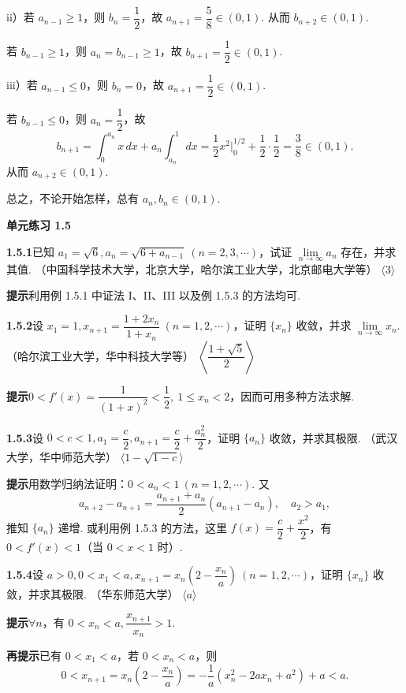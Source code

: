 \documentclass[UTF8, 12pt, fontset=fandol, oneside]{ctexart}
\begin{document}
ii）若 $a_{n-1}\ge 1$，则 $b_n=\dfrac12$，故 $a_{n+1}=\dfrac58\in (0,1)$. 从而 $b_{n+2}\in (0,1)$.

若 $b_{n-1}\ge 1$，则 $a_n=b_{n-1}\ge 1$，故 $b_{n+1}=\dfrac12\in (0,1)$.

iii）若 $a_{n-1}\le 0$，则 $b_n=0$，故 $a_{n+1}=\dfrac12\in (0,1)$.

若 $b_{n-1}\le 0$，则 $a_n=\dfrac12$，故
\[
  b_{n+1}=\int_0^{a_n}x\,dx+a_n\int_{a_n}^1dx
  =\frac12x^2\bigg|_0^{1/2}+\frac12\cdot \frac12
  =\frac38\in (0,1).
\]
从而 $a_{n+2}\in (0,1)$.

总之，不论开始怎样，总有 $a_n,b_n\in (0,1)$.

\noindent\textbf{单元练习 1.5}

\noindent\textbf{1.5.1}\quad 已知 $a_1=\sqrt6,a_n=\sqrt{6+a_{n-1}}\ (n=2,3,\cdots)$，试证 $\lim\limits_{n\to\infty}a_n$ 存在，并求其值. （中国科学技术大学，北京大学，哈尔滨工业大学，北京邮电大学等） \hfill $\langle 3\rangle$

\noindent\textbf{提示}\quad 利用例 1.5.1 中证法 I、II、III 以及例 1.5.3 的方法均可.

\noindent\textbf{1.5.2}\quad 设 $x_1=1,x_{n+1}=\dfrac{1+2x_n}{1+x_n}\ (n=1,2,\cdots)$，证明 $\{x_n\}$ 收敛，并求 $\lim\limits_{n\to\infty}x_n$. （哈尔滨工业大学，华中科技大学等） \hfill $\left\langle \dfrac{1+\sqrt5}{2}\right\rangle$

\noindent\textbf{提示}\quad $0<f'(x)=\dfrac1{(1+x)^2}<\dfrac12,\ 1\le x_n<2$，因而可用多种方法求解.

\noindent\textbf{1.5.3}\quad 设 $0<c<1,a_1=\dfrac c2,a_{n+1}=\dfrac c2+\dfrac{a_n^2}{2}$，证明 $\{a_n\}$ 收敛，并求其极限. （武汉大学，华中师范大学） \hfill $\langle 1-\sqrt{1-c}\rangle$

\noindent\textbf{提示}\quad 用数学归纳法证明：$0<a_n<1\ (n=1,2,\cdots)$. 又
\[
  a_{n+2}-a_{n+1}=\frac{a_{n+1}+a_n}{2}(a_{n+1}-a_n),\quad a_2>a_1,
\]
推知 $\{a_n\}$ 递增. 或利用例 1.5.3 的方法，这里 $f(x)=\dfrac c2+\dfrac{x^2}{2}$，有 $0<f'(x)<1$（当 $0<x<1$ 时）.

\noindent\textbf{1.5.4}\quad 设 $a>0,0<x_1<a,x_{n+1}=x_n\left(2-\dfrac{x_n}{a}\right)\ (n=1,2,\cdots)$，证明 $\{x_n\}$ 收敛，并求其极限. （华东师范大学） \hfill $\langle a\rangle$

\noindent\textbf{提示}\quad $\forall n$，有 $0<x_n<a,\dfrac{x_{n+1}}{x_n}>1$.

\noindent\textbf{再提示}\quad 已有 $0<x_1<a$，若 $0<x_n<a$，则
\[
  0<x_{n+1}=x_n\left(2-\frac{x_n}{a}\right)
  =-\frac1a(x_n^2-2ax_n+a^2)+a<a.
\]
\end{document}
